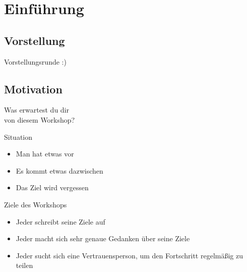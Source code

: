 \section{Einführung}

\subsection{Vorstellung}

\addtocounter{framenumber}{1}
\begin{frame}[standout]
    \LARGE
    Vorstellungsrunde :)
\end{frame}


\subsection{Motivation}


\addtocounter{framenumber}{1}
\begin{frame}[standout]
    \LARGE
    Was erwartest du dir \\
    von diesem Workshop?
\end{frame}


\begin{frame}[c]{Situation}
    \Large
    \begin{itemize}[<+(1)->]
        \item Man hat etwas vor
        \item Es kommt etwas dazwischen
        \item Das Ziel wird vergessen
    \end{itemize}
\end{frame}

\begin{frame}[c]{Ziele des Workshops}
    \large
    \begin{itemize}[<+(1)->]
        \item Jeder schreibt seine Ziele auf
        \item Jeder macht sich sehr genaue Gedanken über seine Ziele
        \item Jeder sucht sich eine Vertrauensperson, um den Fortschritt regelmäßig zu teilen
    \end{itemize}
\end{frame}




